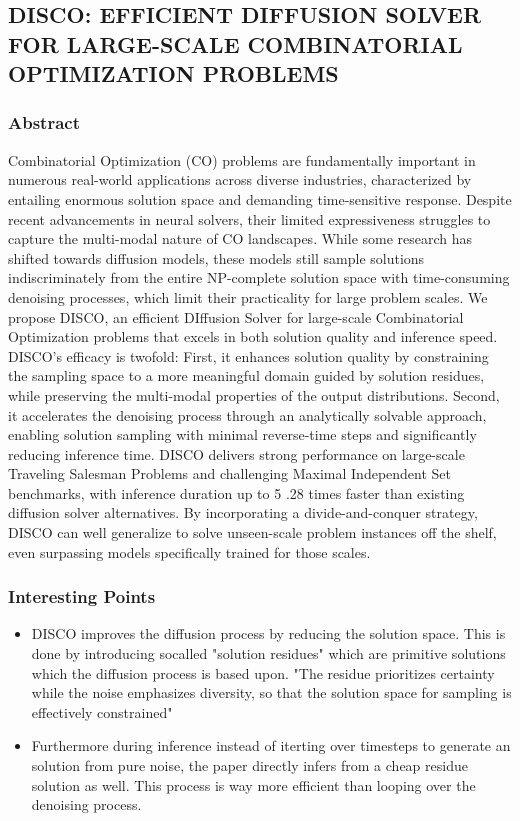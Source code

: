 
\subsection{DISCO: EFFICIENT DIFFUSION SOLVER FOR LARGE-SCALE COMBINATORIAL OPTIMIZATION PROBLEMS}
\subsubsection{Abstract}
Combinatorial Optimization (CO) problems are fundamentally important in numerous real-world applications across diverse industries, characterized by entailing
enormous solution space and demanding time-sensitive response. Despite recent
advancements in neural solvers, their limited expressiveness struggles to capture
the multi-modal nature of CO landscapes. While some research has shifted towards
diffusion models, these models still sample solutions indiscriminately from the entire NP-complete solution space with time-consuming denoising processes, which
limit their practicality for large problem scales. We propose DISCO, an efficient
DIffusion
Solver for large-scale
Combinatorial
Optimization problems that excels
in both solution quality and inference speed. DISCO’s efficacy is twofold: First, it
enhances solution quality by constraining the sampling space to a more meaningful
domain guided by solution residues, while preserving the multi-modal properties of
the output distributions. Second, it accelerates the denoising process through an analytically solvable approach, enabling solution sampling with minimal reverse-time
steps and significantly reducing inference time. DISCO delivers strong performance on large-scale Traveling Salesman Problems and challenging Maximal
Independent Set benchmarks, with inference duration up to
5
.28 times faster than
existing diffusion solver alternatives. By incorporating a divide-and-conquer strategy, DISCO can well generalize to solve unseen-scale problem instances off the
shelf, even surpassing models specifically trained for those scales.
\subsubsection{Interesting Points}
\begin{itemize}
    \item DISCO improves the diffusion process by reducing the solution space. This is done by introducing socalled "solution residues" which are primitive solutions which the diffusion process is based upon. "The residue prioritizes certainty while the noise emphasizes diversity, so that the solution space for
    sampling is effectively constrained"
    \item Furthermore during inference instead of iterting over timesteps to generate an solution from pure noise, the paper directly infers from a cheap residue solution as well. This process is way more efficient than looping over the denoising process.
\end{itemize}